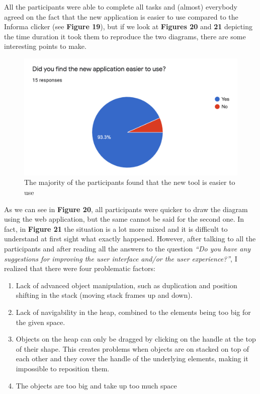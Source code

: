 \documentclass[]{usiinfbachelorproject}
\begin{document}
All the participants were able to complete all tasks and (almost) everybody agreed on the fact that the new application is easier to use compared to the Informa clicker (see \textbf{Figure 19}), but if we look at \textbf{Figures 20} and \textbf{21} depicting the time duration it took them to reproduce the two diagrams, there are some interesting points to make.

\begin{figure}[h!]
\centering
\includegraphics[scale=0.6]{figures/ease-of-use.png}
\caption {The majority of the participants found that the new tool is easier to use}
\end{figure}

\bigskip

\noindent As we can see in \textbf{Figure 20}, all participants were quicker to draw the diagram using the web application, but the same cannot be said for the second one. In fact, in \textbf{Figure 21} the situation is a lot more mixed and it is difficult to understand at first sight what exactly happened. However, after talking to all the participants and after reading all the answers to the question \emph{``Do you have any suggestions for improving the user interface and/or the user experience?''}, I realized that there were four problematic factors:

\begin{enumerate}
	\item Lack of advanced object manipulation, such as duplication and position shifting in the stack (moving stack frames up and down).
	\item Lack of navigability in the heap, combined to the elements being too big for the given space.
	\item Objects on the heap can only be dragged by clicking on the handle at the top of their shape. This creates problems when objects are on stacked on top of each other and they cover the handle of the underlying elements, making it impossible to reposition them.
	\item The objects are too big and take up too much space
\end{enumerate}
\end{document}
